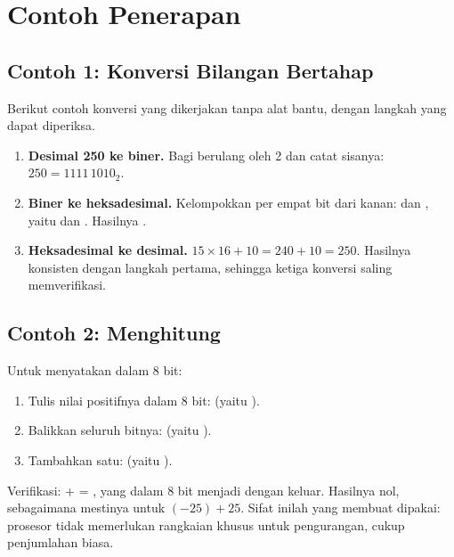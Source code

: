 \section{Contoh Penerapan}
\label{sec:contoh-bab2}

\subsection{Contoh 1: Konversi Bilangan Bertahap}

Berikut contoh konversi yang dikerjakan tanpa alat bantu, dengan
langkah yang dapat diperiksa.

\begin{enumerate}
    \item \textbf{Desimal 250 ke biner.}
          Bagi berulang oleh 2 dan catat sisanya:
          $250 = 1111\,1010_2$.

    \item \textbf{Biner  ke heksadesimal.}
          Kelompokkan per empat bit dari kanan:  dan
          , yaitu  dan . Hasilnya
          .

    \item \textbf{Heksadesimal  ke desimal.}
          $15 \times 16 + 10 = 240 + 10 = 250$. Hasilnya konsisten
          dengan langkah pertama, sehingga ketiga konversi saling
          memverifikasi.
\end{enumerate}

\subsection{Contoh 2: Menghitung }

Untuk menyatakan  dalam 8 bit:

\begin{enumerate}
    \item Tulis nilai positifnya dalam 8 bit: 
          (yaitu ).
    \item Balikkan seluruh bitnya:  (yaitu
          ).
    \item Tambahkan satu:  (yaitu ).
\end{enumerate}

Verifikasi:  +  = , yang dalam 8 bit menjadi
 dengan  keluar. Hasilnya nol, sebagaimana
mestinya untuk $(-25) + 25$. Sifat inilah yang membuat
 dipakai: prosesor tidak memerlukan rangkaian
khusus untuk pengurangan, cukup penjumlahan biasa.

